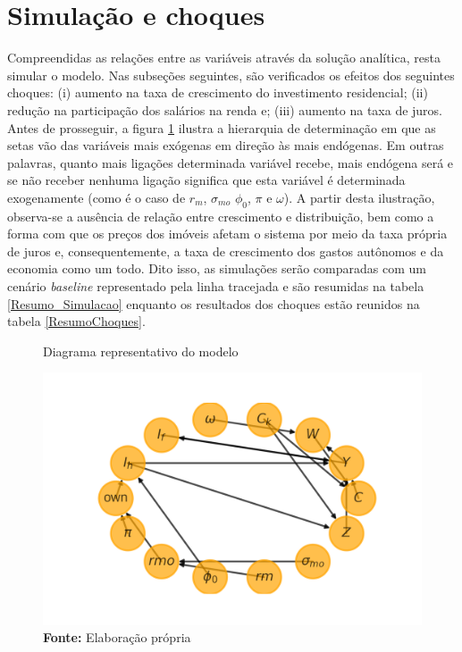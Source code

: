 \section{Simulação e choques}
\label{SecChoques}

Compreendidas as relações entre as variáveis através da solução analítica, resta simular o modelo. Nas subseções seguintes, são verificados os efeitos dos seguintes choques:
(i) aumento na taxa de crescimento do investimento residencial; (ii) redução na participação dos salários na renda e;  (iii) aumento na taxa de juros. Antes de prosseguir, a figura \ref{dag} ilustra a hierarquia de determinação em que as setas vão das variáveis mais exógenas em direção às mais endógenas. Em outras palavras, quanto mais ligações determinada variável recebe, mais endógena será e se não receber nenhuma ligação significa que esta variável é determinada exogenamente (como é o caso de $r_m$, $\sigma_{mo}$ $\phi_0$, $\pi$ e $\omega$).
A partir desta ilustração, observa-se a ausência de relação entre crescimento e distribuição, bem como a forma com que os preços dos imóveis afetam o sistema por meio da taxa própria de juros e, consequentemente, a taxa de crescimento dos gastos autônomos e da economia como um todo. 
Dito isso, as simulações serão comparadas com um cenário \textit{baseline} representado pela linha tracejada e são resumidas na tabela \ref{Resumo_Simulacao} enquanto os resultados dos choques estão reunidos na tabela \ref{ResumoChoques}.

\begin{figure}[H]
	\centering
	\caption{Diagrama representativo do modelo}
		\label{dag}
	\includegraphics[width=\textwidth]{../../Modelo/Versoes/Dag.png}
	\caption*{\textbf{Fonte:} Elaboração própria}
\end{figure}




